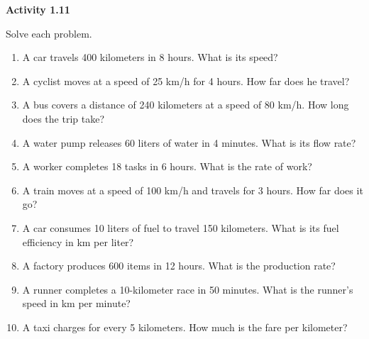 \vspace{0.3ex}
\noindent\textbf{Activity 1.11}

\vspace{0.2ex}

Solve each problem.
\begin{enumerate}
    \item A car travels 400 kilometers in 8 hours. What is its speed?
    \item A cyclist moves at a speed of 25 km/h for 4 hours. How far does he travel?
    \item A bus covers a distance of 240 kilometers at a speed of 80 km/h. How long does the trip take?
    \item A water pump releases 60 liters of water in 4 minutes. What is its flow rate?
    \item A worker completes 18 tasks in 6 hours. What is the rate of work?
    \item A train moves at a speed of 100 km/h and travels for 3 hours. How far does it go?
    \item A car consumes 10 liters of fuel to travel 150 kilometers. What is its fuel efficiency in km per liter?
    \item A factory produces 600 items in 12 hours. What is the production rate?
    \item A runner completes a 10-kilometer race in 50 minutes. What is the runner's speed in km per minute?
    \item A taxi charges   for every 5 kilometers. How much is the fare per kilometer?
\end{enumerate}
